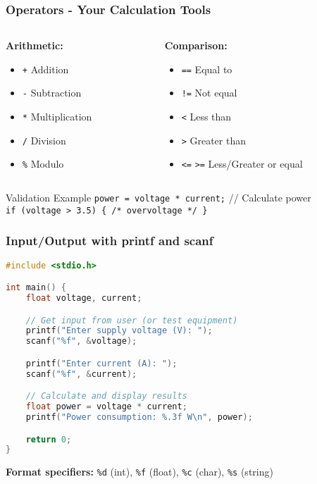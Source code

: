 \documentclass{beamer}
\begin{document}
\begin{frame}
\frametitle{Operators - Your Calculation Tools}
\begin{columns}
\begin{column}{0.5\textwidth}
\textbf{Arithmetic:}
\begin{itemize}
    \item \texttt{+} Addition
    \item \texttt{-} Subtraction
    \item \texttt{*} Multiplication
    \item \texttt{/} Division
    \item \texttt{\%} Modulo
\end{itemize}
\end{column}
\begin{column}{0.5\textwidth}
\textbf{Comparison:}
\begin{itemize}
    \item \texttt{==} Equal to
    \item \texttt{!=} Not equal
    \item \texttt{<} Less than
    \item \texttt{>} Greater than
    \item \texttt{<=} \texttt{>=} Less/Greater or equal
\end{itemize}
\end{column}
\end{columns}

\vspace{0.5cm}
\begin{exampleblock}{Validation Example}
\texttt{power = voltage * current;} // Calculate power\\
\texttt{if (voltage > 3.5) \{ /* overvoltage */ \}}
\end{exampleblock}
\end{frame}

\begin{frame}[fragile]
\frametitle{Input/Output with printf and scanf}
\begin{lstlisting}[language=C]
#include <stdio.h>

int main() {
    float voltage, current;

    // Get input from user (or test equipment)
    printf("Enter supply voltage (V): ");
    scanf("%f", &voltage);

    printf("Enter current (A): ");
    scanf("%f", &current);

    // Calculate and display results
    float power = voltage * current;
    printf("Power consumption: %.3f W\n", power);

    return 0;
}
\end{lstlisting}

\textbf{Format specifiers:} \texttt{\%d} (int), \texttt{\%f} (float), \texttt{\%c} (char), \texttt{\%s} (string)
\end{frame}
\end{document}
